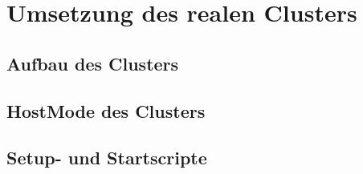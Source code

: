 \section{Umsetzung des realen Clusters}
\label{sec:realCluster}

\subsection{Aufbau des Clusters}
\label{subsec:clusterBasics}

\subsection{HostMode des Clusters}
\label{subsec:hostMode}

\subsection{Setup- und Startscripte}
\label{subsec:scripts}

